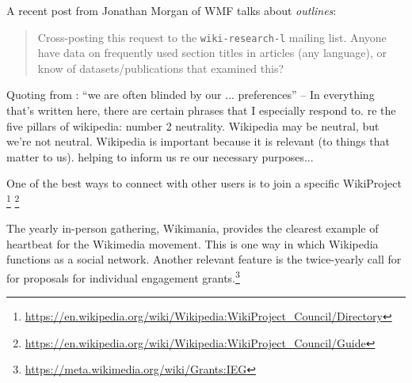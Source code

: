 A recent post from Jonathan Morgan of WMF talks about \emph{outlines}: 

\begin{quotation}
\noindent Cross-posting this request to the {\tt wiki-research-l} mailing
list. Anyone have data on frequently used section titles in articles
(any language), or know of datasets/publications that examined this?
\end{quotation}

Quoting from : ``we are often blinded
by our ... preferences'' -- In everything that's written here, there
are certain phrases that I especially respond to.
%
%
re the five pillars of wikipedia: number 2 neutrality.  Wikipedia may
be neutral, but we're not neutral.
%
%
%
Wikipedia is important because it is relevant (to things that matter
to us).  helping to inform us re our necessary purposes...


One of the best ways to connect with other users is to join a specific WikiProject \footnote{\url{https://en.wikipedia.org/wiki/Wikipedia:WikiProject_Council/Directory}}
\footnote{\url{https://en.wikipedia.org/wiki/Wikipedia:WikiProject_Council/Guide}}
 
 The yearly in-person gathering, Wikimania,
provides the clearest example of heartbeat for the Wikimedia movement.
This is one way in which Wikipedia functions as a social network. 
Another relevant feature is the twice-yearly call for for proposals for
individual engagement grants.\footnote{\url{https://meta.wikimedia.org/wiki/Grants:IEG}}

